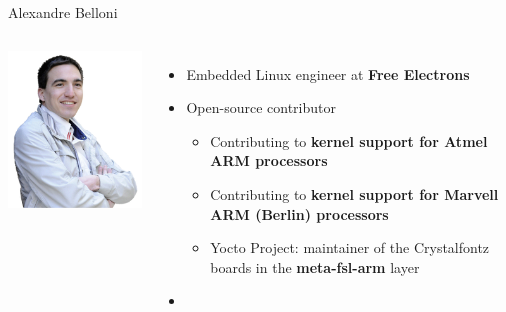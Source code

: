\begin{frame}{Alexandre Belloni}
 \begin{columns}
    \includegraphics[width=\textwidth]{slides/first-slides/alexandre-belloni.png}
    \begin{itemize}
      \item Embedded Linux engineer at {\bf Free Electrons}
      \item Open-source contributor
        \begin{itemize}
          \item Contributing to {\bf kernel support for Atmel ARM
            processors}
          \item Contributing to {\bf kernel support for Marvell
            ARM (Berlin) processors}
          \item Yocto Project: maintainer of the Crystalfontz boards
            in the {\bf meta-fsl-arm} layer
        \end{itemize}
      \item {}
    \end{itemize}
 \end{columns}
\end{frame}

